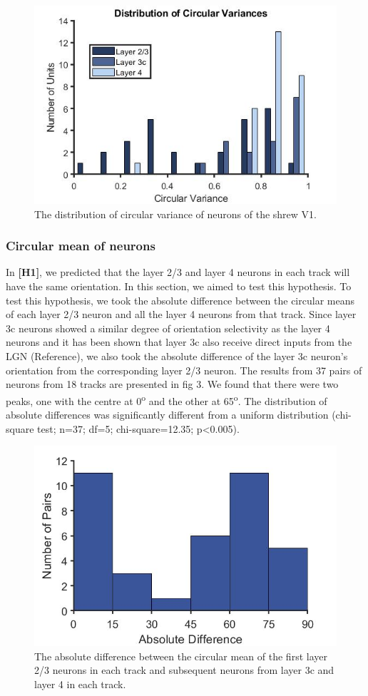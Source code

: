 \begin{figure}[H]
	
	\includegraphics[width=\linewidth]{ShrewV1/cv_lamina_2_bw.jpg}
	\caption{The distribution of circular variance of neurons of the shrew V1.}
	\label{fig:cv}
\end{figure} 

\subsubsection{Circular mean of neurons}

In \textbf{{[}H1{]}}, we predicted that the layer 2/3 and layer 4
neurons in each track will have the same orientation. In this section,
we aimed to test this hypothesis. To test this hypothesis, we took the
absolute difference between the circular means of each layer 2/3 neuron
and all the layer 4 neurons from that track. Since layer 3c neurons
showed a similar degree of orientation selectivity as the layer 4
neurons and it has been shown that layer 3c also receive direct inputs
from the LGN (Reference), we also took the absolute difference of the
layer 3c neuron's orientation from the corresponding layer 2/3 neuron.
The results from 37 pairs of neurons from 18 tracks are presented in fig
3. We found that there were two peaks, one with the centre at
0\textsuperscript{o} and the other at 65\textsuperscript{o}. The
distribution of absolute differences was significantly different from a
uniform distribution (chi-square test; n=37; df=5; chi-square=12.35;
p\textless{}0.005).

	\begin{figure}[H]
	\centering
	\includegraphics[width=0.5\linewidth]{ShrewV1/cmdiff.jpg}
	\caption{The absolute difference between the circular mean of the first layer 2/3 neurons in each track and subsequent neurons from layer 3c and layer 4 in each track.}
	\label{fig:cmdiff}
\end{figure}


